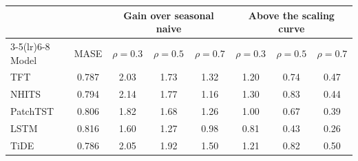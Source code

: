 \begin{tabular}{lccccccc}
\toprule
 & & \multicolumn{3}{c}{Gain over seasonal naive} & \multicolumn{3}{c}{Above the scaling curve} \\
\cmidrule(lr){3-5}\cmidrule(lr){6-8}
Model & MASE & $\rho{=}0.3$ & $\rho{=}0.5$ & $\rho{=}0.7$ & $\rho{=}0.3$ & $\rho{=}0.5$ & $\rho{=}0.7$ \\
\midrule
TFT & 0.787 & 2.03 & 1.73 & 1.32 & 1.20 & 0.74 & 0.47 \\
NHITS & 0.794 & 2.14 & 1.77 & 1.16 & 1.30 & 0.83 & 0.44 \\
PatchTST & 0.806 & 1.82 & 1.68 & 1.26 & 1.00 & 0.67 & 0.39 \\
LSTM & 0.816 & 1.60 & 1.27 & 0.98 & 0.81 & 0.43 & 0.26 \\
TiDE & 0.786 & 2.05 & 1.92 & 1.50 & 1.21 & 0.82 & 0.50 \\
\bottomrule
\end{tabular}
